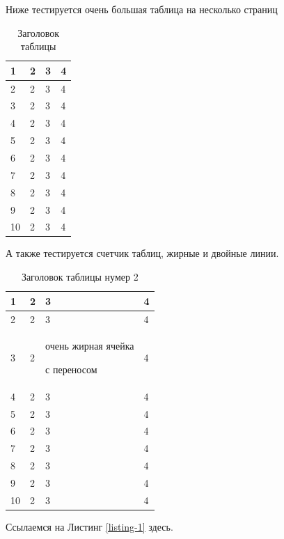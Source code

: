 \documentclass[a4paper,14pt]{extarticle}
\begin{document}
Ниже тестируется очень большая таблица на несколько страниц

\begin{center}
    \begin{longtable}{|p{2cm}|p{3cm}|p{7cm}|p{3cm}|}
    \caption{Заголовок таблицы}\\
    \hline
    1 & 2 & 3 & 4\\ 
    \hline 
    2 & 2 & 3 & 4\\
    \hline
    3 & 2 & 3 & 4\\
    \hline
    4 & 2 & 3 & 4\\
    \hline
    5 & 2 & 3 & 4\\
    \hline
    6 & 2 & 3 & 4\\
    \hline
    7 & 2 & 3 & 4\\
    \hline
    8 & 2 & 3 & 4\\
    \hline
    9 & 2 & 3 & 4\\
    \hline
    10 & 2 & 3 & 4\\
    \hline
    
    
    \end{longtable}
\end{center}


А также тестируется счетчик таблиц, жирные и двойные линии.

\begin{center}
    \begin{longtable}{|p{2cm}||p{3cm}|p{7cm}|p{3cm}|}
    \caption{Заголовок таблицы нумер 2}\\
    \hline
    1 & 2 & 3 & 4\\ 
    \hline
    2 & 2 & 3 & 4\\
    \hline
    3 & 2 & очень жирная ячейка \par с переносом & 4\\
    \hline
    4 & 2 & 3 & 4\\
    \hline
    5 & 2 & 3 & 4\\
    \hline
    6 & 2 & 3 & 4\\
    \hline
    7 & 2 & 3 & 4\\
    \hline
    8 & 2 & 3 & 4\\
    \hline
    9 & 2 & 3 & 4\\
    \hline
    10 & 2 & 3 & 4\\
    \hline
    
    
    \end{longtable}
\end{center}

Ссылаемся на Листинг \ref{listing-1} здесь.
\end{document}

